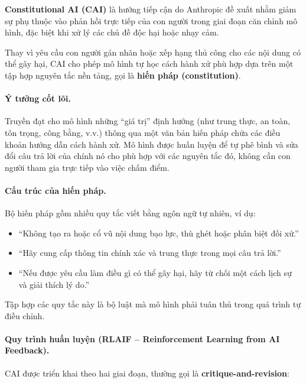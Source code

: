 \textbf{Constitutional AI (CAI)} \cite{bai2022constitutional} là hướng tiếp cận do Anthropic đề xuất nhằm giảm sự phụ thuộc vào phản hồi trực tiếp của con người trong giai đoạn căn chỉnh mô hình, đặc biệt khi xử lý các chủ đề độc hại hoặc nhạy cảm.

Thay vì yêu cầu con người gán nhãn hoặc xếp hạng thủ công cho các nội dung có thể gây hại, CAI cho phép mô hình tự học cách hành xử phù hợp dựa trên một tập hợp nguyên tắc nền tảng, gọi là \textbf{hiến pháp (constitution)}.

\paragraph{Ý tưởng cốt lõi.}
    Truyền đạt cho mô hình những “giá trị” định hướng (như trung thực, an toàn, tôn trọng, công bằng, v.v.) thông qua một văn bản hiến pháp chứa các điều khoản hướng dẫn cách hành xử.
    Mô hình được huấn luyện để tự phê bình và sửa đổi câu trả lời của chính nó cho phù hợp với các nguyên tắc đó, không cần con người tham gia trực tiếp vào việc chấm điểm.

\paragraph{Cấu trúc của hiến pháp.}
    Bộ hiến pháp gồm nhiều quy tắc viết bằng ngôn ngữ tự nhiên, ví dụ:
    \begin{itemize}
        \item “Không tạo ra hoặc cổ vũ nội dung bạo lực, thù ghét hoặc phân biệt đối xử.”
        \item “Hãy cung cấp thông tin chính xác và trung thực trong mọi câu trả lời.”
        \item “Nếu được yêu cầu làm điều gì có thể gây hại, hãy từ chối một cách lịch sự và giải thích lý do.” 
    \end{itemize}
    Tập hợp các quy tắc này là bộ luật mà mô hình phải tuân thủ trong quá trình tự điều chỉnh.

\paragraph{Quy trình huấn luyện (RLAIF -- Reinforcement Learning from AI Feedback).}
    CAI được triển khai theo hai giai đoạn, thường gọi là \textbf{critique-and-revision}:


